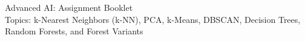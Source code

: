 \documentclass[11pt]{article}
\begin{document}
\begin{center}
{\LARGE Advanced AI: Assignment Booklet}\\[0.4em]
{\large Topics: k-Nearest Neighbors (k-NN), PCA, k-Means, DBSCAN, Decision Trees, Random Forests, and Forest Variants}
\end{center}








\end{document}
